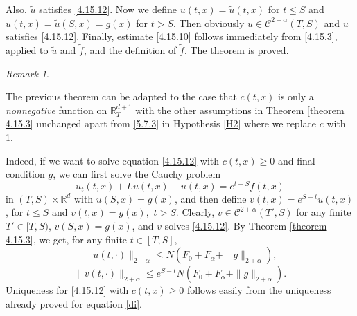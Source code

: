 \documentclass[reqno,12pt]{amsart}
\theoremstyle{definition}
\theoremstyle{remark}
\newtheorem{remark}[theorem]{Remark}
\begin{document}
Also, $\tilde{u}$ satisfies \eqref{4.15.12}.  Now we define
$u(t,x)=\tilde{u}(t,x)$ for $t\leq S$ and
$u(t,x)=\tilde{u}(S,x)=g(x)$ for $t>S$. Then obviously
$u\in{\mathcal{C}}^{2+\alpha}(T,S)$ and $u$ satisfies \eqref{4.15.12}.
Finally, estimate \eqref{4.15.10} follows immediately from
\eqref{4.15.3}, applied to $\tilde{u}$ and $\tilde{f}$, and the
definition of $\tilde{f}$. The theorem is proved.

\begin{remark}
                                        \label{remark 6.13.1}

   The previous theorem  can be adapted to the case
that    $c (t,x)$
     is only  a {\it  nonnegative} function
     on ${\mathbb{R}}^{d+1}_T$
   with the other
   assumptions in Theorem \ref{theorem 4.15.3}
unchanged apart from \eqref{5.7.3} in Hypothesis \ref{H2}
   where we
replace $c$ with 1.

     Indeed,  if we want to solve
    equation  \eqref{4.15.12}
   with $c (t,x) \ge 0$ and
    final condition $g$,
       we can first
   solve the Cauchy problem
    \begin{equation} \label{di}
u_{t}(t,x)+Lu(t,x) -  u(t,x) =e^{ t-S }f(t,x)
   \end{equation}
in $(T,S)\times{\mathbb{R}}^{d}$ with $u(S,x)=g(x)$,
   and then define $v (t,x) = e^{ S- t }
   u(t,x)$,
for $t \le S$ and $v(t,x) = g(x),$ $t>S $. Clearly,  $v
\in{\mathcal{C}}^{2+\alpha}(T',S)$ for any finite $T'\in[T,S)$, $v(S, x) =
g(x)$, and $v$ solves \eqref{4.15.12}.
   By Theorem \ref{theorem 4.15.3}, we get,
    for any  finite $t\in[T,S]$,
$$
\| u(t, \cdot)\|_{2 + \alpha} \le N(
F_{0}+F_{\alpha}+\|g\|_{2+\alpha}),
$$
$$
\| v(t, \cdot)\|_{2 + \alpha} \le e^{S-t}
N(F_{0}+F_{\alpha}+\|g\|_{2+\alpha}).
$$
    Uniqueness for  
     \eqref{4.15.12} with $c (t,x) \ge 0$
      follows easily  from  the uniqueness already proved
       for equation \eqref{di}.

\end{remark}
\end{document}
